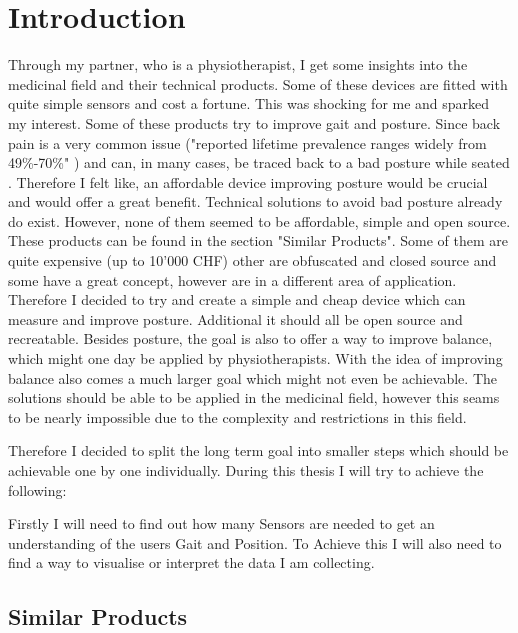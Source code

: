 \chapter*{Introduction}
\label{chap:Introduction}
\renewcommand{\thesection}{\arabic{section}}
\setcounter{section}{0}

Through my partner, who is a physiotherapist, I get some insights into the medicinal field and their technical products. Some of these devices are fitted with quite simple sensors and cost a fortune. This was shocking for me and sparked my interest. Some of these products try to improve gait and posture. Since back pain is a very common issue ("reported lifetime prevalence ranges widely from 49\%-70\%" \cite{backpain00:study})  and can, in many cases, be traced back to a bad posture while seated \cite{sitting00:study}. Therefore I felt like, an affordable device improving posture would be crucial and would offer a great benefit.
Technical solutions to avoid bad posture already do exist. However, none of them seemed to be affordable, simple and open source. These products can be found in the section "Similar Products". Some of them are quite expensive (up to 10'000 CHF) other are obfuscated and closed source and some have a great concept, however are in a different area of application. Therefore I decided to try and create a simple and cheap device which can measure and improve posture. Additional it should all be open source and recreatable. Besides posture, the goal is also to offer a way to improve balance, which might one day be applied by physiotherapists.
With the idea of improving balance also comes a much larger goal which might not even be achievable. The solutions should be able to be applied in the medicinal field, however this seams to be nearly impossible due to the complexity and restrictions in this field. 

Therefore I decided to split the long term goal into smaller steps which should be achievable one by one individually. During this thesis I will try to achieve the following:

Firstly I will need to find out how many Sensors are needed to get an understanding of the users Gait and Position. To Achieve this I will also need to find a way to visualise or interpret the data I am collecting.

\section{Similar Products}

